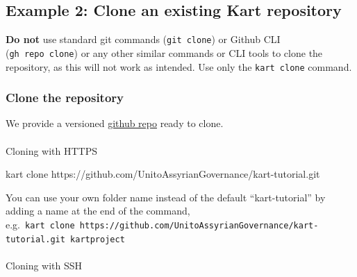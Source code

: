 \documentclass[
  letterpaper,
  DIV=11,
  numbers=noendperiod]{scrartcl}
\makeatletter
\let\oldparagraph\paragraph
\renewcommand{\paragraph}{
    \@ifstar
      \xxxParagraphStar
      \xxxParagraphNoStar
  }
\newcommand{\xxxParagraphStar}[1]{\oldparagraph*{#1}\mbox{}}
\newcommand{\xxxParagraphNoStar}[1]{\oldparagraph{#1}\mbox{}}
\newenvironment{Shaded}{\begin{snugshade}}{\end{snugshade}}
\newcommand{\ExtensionTok}[1]{\textcolor[rgb]{0.55,0.91,0.99}{#1}}
\newcommand{\NormalTok}[1]{\textcolor[rgb]{0.97,0.97,0.95}{#1}}
\makeatother
\begin{document}
\subsection{Example 2: Clone an existing Kart
repository}\label{sec-clone-repo}

\textbf{Do not} use standard git commands (\texttt{git\ clone}) or
Github CLI (\texttt{gh\ repo\ clone}) or any other similar commands or
CLI tools to clone the repository, as this will not work as intended.
Use only the \texttt{kart\ clone} command.

\subsubsection{Clone the repository}\label{sec-clone}

We provide a versioned
\href{https://github.com/UnitoAssyrianGovernance/kart-tutorial-dataset}{github
repo} ready to clone.

\paragraph{Cloning with HTTPS}\label{sec-clone-https}

\begin{Shaded}
\begin{Highlighting}[]
\ExtensionTok{kart}\NormalTok{ clone https://github.com/UnitoAssyrianGovernance/kart{-}tutorial.git}
\end{Highlighting}
\end{Shaded}

\begin{tcolorbox}[enhanced jigsaw, arc=.35mm, colbacktitle=quarto-callout-tip-color!10!white, colframe=quarto-callout-tip-color-frame, coltitle=black, breakable, left=2mm, bottomrule=.15mm, rightrule=.15mm, opacitybacktitle=0.6, titlerule=0mm, opacityback=0, toptitle=1mm, title=\textcolor{quarto-callout-tip-color}{\faLightbulb}\hspace{0.5em}{Tip}, toprule=.15mm, bottomtitle=1mm, colback=white, leftrule=.75mm]

You can use your own folder name instead of the default
``kart-tutorial'' by adding a name at the end of the command,
e.g.~\texttt{kart\ clone\ https://github.com/UnitoAssyrianGovernance/kart-tutorial.git\ kartproject}

\end{tcolorbox}

\paragraph{Cloning with SSH}\label{sec-clone-ssh}
\end{document}
